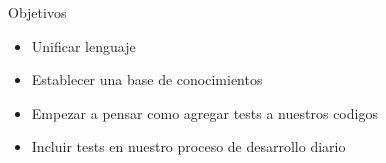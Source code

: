 
\begin{frame}{Objetivos}
    \begin{itemize}
        \item Unificar lenguaje
        \item Establecer una base de conocimientos
        \item Empezar a pensar como agregar tests a nuestros codigos
        \item Incluir tests en nuestro proceso de desarrollo diario
    \end{itemize}
\end{frame}
